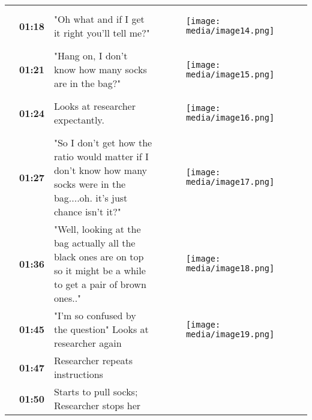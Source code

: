 \documentclass{article}
\begin{document}
\begin{table}

  
\begin{tabular}{l  l  l  l}

   & \textbf{01:18} & "Oh what and if I get it right you'll tell me?" & 
\begin{figure}

  \texttt{[image: media/image14.png]}
\caption{}
\label{}


\end{figure}
\\
 & \textbf{01:21} & "Hang on, I don't know how many socks are in the bag?" & 
\begin{figure}

  \texttt{[image: media/image15.png]}
\caption{}
\label{}


\end{figure}
\\
 & \textbf{01:24} & Looks at researcher expectantly. & 
\begin{figure}

  \texttt{[image: media/image16.png]}
\caption{}
\label{}


\end{figure}
\\
 & \textbf{01:27} & "So I don't get how the ratio would matter if I don't know how many socks were in the bag....oh. it's just chance isn't it?" & 
\begin{figure}

  \texttt{[image: media/image17.png]}
\caption{}
\label{}


\end{figure}
\\
 & \textbf{01:36} & "Well, looking at the bag actually all the black ones are on top so it might be a while to get a pair of brown ones.." & 
\begin{figure}

  \texttt{[image: media/image18.png]}
\caption{}
\label{}


\end{figure}
\\
 & \textbf{01:45} & "I'm so confused by the question" Looks at researcher again & 
\begin{figure}

  \texttt{[image: media/image19.png]}
\caption{}
\label{}


\end{figure}
\\
 & \textbf{01:47} & Researcher repeats instructions & \\
 & \textbf{01:50} & Starts to pull socks; Researcher stops her & 
\begin{figure}


\end{figure}
\end{tabular}
\end{table}
\end{document}
